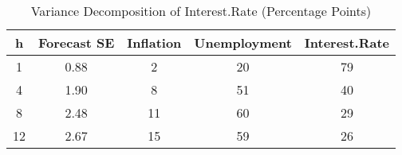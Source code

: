 \begin{table}[ht]
\centering
\caption{Variance Decomposition of Interest.Rate (Percentage Points)} 
\label{tab:VD-3}
\begin{tabular}{|c|c|ccc|}
  \hline
h & Forecast SE & Inflation & Unemployment & Interest.Rate \\ 
  \hline
1 & 0.88 & 2 & 20 & 79 \\ 
  4 & 1.90 & 8 & 51 & 40 \\ 
  8 & 2.48 & 11 & 60 & 29 \\ 
  12 & 2.67 & 15 & 59 & 26 \\ 
   \hline
\end{tabular}
\end{table}
